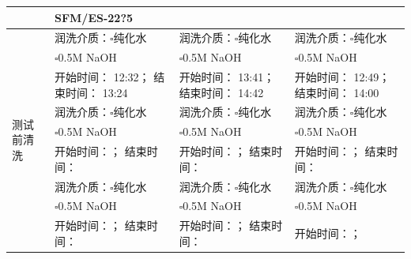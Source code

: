 \documentclass[UTF8,10pt,a4paper,fontset=fandol]{ctexart}
\newcommand{\fieldvalue}[1]{#1}
\newcommand{\handwritten}[1]{#1}
\begin{document}
\begin{tabularx}{\textwidth}{|p{2.5cm}|X|p{2.5cm}|X|}
&
\fieldvalue{\handwritten{SFM/ES-22?5}}
&
&
\\
\hline
\multirow{9}{*}{测试前清洗}
&
润洗介质：$\square$纯化水
&
润洗介质：$\square$纯化水
&
润洗介质：$\square$纯化水
\\
&
$\square$0.5M NaOH
&
$\square$0.5M NaOH
&
$\square$0.5M NaOH
\\
&
开始时间：
\fieldvalue{\handwritten{12:32}}；
结束时间：
\fieldvalue{\handwritten{13:24}}
&
开始时间：
\fieldvalue{\handwritten{13:41}}；
结束时间：
\fieldvalue{\handwritten{14:42}}
&
开始时间：
\fieldvalue{\handwritten{12:49}}；
结束时间：
\fieldvalue{\handwritten{14:00}}
\\
\cline{2-4}
&
润洗介质：$\square$纯化水
&
润洗介质：$\square$纯化水
&
润洗介质：$\square$纯化水
\\
&
$\square$0.5M NaOH
&
$\square$0.5M NaOH
&
$\square$0.5M NaOH
\\
&
开始时间：\underline{\hspace{1cm}}；
结束时间：\underline{\hspace{1cm}}
&
开始时间：\underline{\hspace{1cm}}；
结束时间：\underline{\hspace{1cm}}
&
开始时间：\underline{\hspace{1cm}}；
结束时间：\underline{\hspace{1cm}}
\\
\cline{2-4}
&
润洗介质：$\square$纯化水
&
润洗介质：$\square$纯化水
&
润洗介质：$\square$纯化水
\\
&
$\square$0.5M NaOH
&
$\square$0.5M NaOH
&
$\square$0.5M NaOH
\\
&
开始时间：\underline{\hspace{1cm}}；
结束时间：\underline{\hspace{1cm}}
&
开始时间：\underline{\hspace{1cm}}；
结束时间：\underline{\hspace{1cm}}
&
开始时间：\underline{\hspace{1cm}}；

\end{tabularx}
\end{document}
